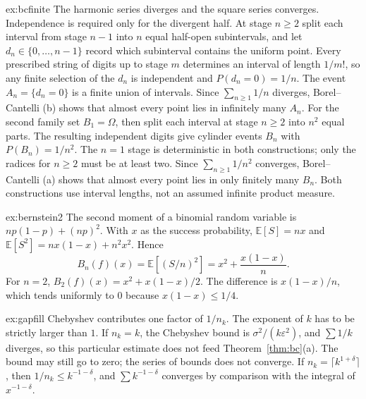 \begin{solution}{ex:bcfinite}
\idea The harmonic series diverges and the square series converges. Independence is required only for the divergent half.
\writeup At stage $n\ge2$ split each interval from stage $n-1$ into $n$ equal half-open subintervals, and let $d_n\in\{0,\ldots,n-1\}$ record which subinterval contains the uniform point. Every prescribed string of digits up to stage $m$ determines an interval of length $1/m!$, so any finite selection of the $d_n$ is independent and $P(d_n=0)=1/n$. The event $A_n=\{d_n=0\}$ is a finite union of intervals. Since $\sum_{n\ge1}1/n$ diverges, Borel--Cantelli (b) shows that almost every point lies in infinitely many $A_n$. For the second family set $B_1=\Omega$, then split each interval at stage $n\ge2$ into $n^2$ equal parts. The resulting independent digits give cylinder events $B_n$ with $P(B_n)=1/n^2$. The $n=1$ stage is deterministic in both constructions; only the radices for $n\ge2$ must be at least two. Since $\sum_{n\ge1}1/n^2$ converges, Borel--Cantelli (a) shows that almost every point lies in only finitely many $B_n$. Both constructions use interval lengths, not an assumed infinite product measure.
\end{solution}

\begin{solution}{ex:bernstein2}
\idea The second moment of a binomial random variable is $np(1-p)+(np)^2$.
\writeup With $x$ as the success probability, $\mathbb E[S]=nx$ and $\mathbb E[S^2]=nx(1-x)+n^2x^2$. Hence
\[
 B_n(f)(x)=\mathbb E[(S/n)^2]=x^2+\frac{x(1-x)}{n}.
\]
For $n=2$, $B_2(f)(x)=x^2+x(1-x)/2$. The difference is $x(1-x)/n$, which tends uniformly to $0$ because $x(1-x)\le1/4$.
\end{solution}

\begin{solution}{ex:gapfill}
\idea Chebyshev contributes one factor of $1/n_k$. The exponent of $k$ has to be strictly larger than $1$.
\writeup If $n_k=k$, the Chebyshev bound is $\sigma^2/(k\varepsilon^2)$, and $\sum 1/k$ diverges, so this particular estimate does not feed Theorem~\ref{thm:bc}(a). The bound may still go to zero; the series of bounds does not converge. If $n_k=\lceil k^{1+\delta}\rceil$, then $1/n_k\le k^{-1-\delta}$, and $\sum k^{-1-\delta}$ converges by comparison with the integral of $x^{-1-\delta}$.
\end{solution}

